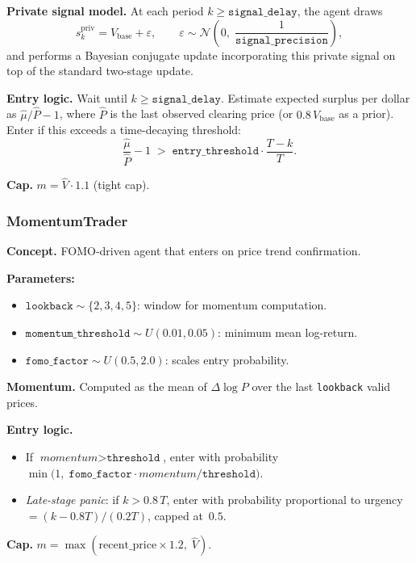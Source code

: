 \documentclass[11pt,a4paper]{article}
\begin{document}
\textbf{Private signal model.}  At each period $k \geq \texttt{signal\_delay}$, the agent draws
\[
  s^{\text{priv}}_k = V_{\text{base}} + \varepsilon, \qquad \varepsilon \sim \mathcal{N}\!\left(0,\;\frac{1}{\texttt{signal\_precision}}\right),
\]
and performs a Bayesian conjugate update incorporating this private signal on top of the standard two-stage update.

\textbf{Entry logic.}  Wait until $k \geq \texttt{signal\_delay}$.  Estimate expected surplus per dollar as $\hat{\mu}/\hat{P} - 1$, where $\hat{P}$ is the last observed clearing price (or $0.8\,V_{\text{base}}$ as a prior).  Enter if this exceeds a time-decaying threshold:
\[
  \frac{\hat{\mu}}{\hat{P}} - 1 \;>\; \texttt{entry\_threshold} \cdot \frac{T - k}{T}.
\]

\textbf{Cap.}  $m = \hat{V} \cdot 1.1$ (tight cap).


\subsubsection{MomentumTrader}
\label{sec:momentum-trader}

\textbf{Concept.}  FOMO-driven agent that enters on price trend confirmation.

\textbf{Parameters:}
\begin{itemize}[nosep]
  \item $\texttt{lookback} \sim \{2,3,4,5\}$: window for momentum computation.
  \item $\texttt{momentum\_threshold} \sim U(0.01,0.05)$: minimum mean log-return.
  \item $\texttt{fomo\_factor} \sim U(0.5,2.0)$: scales entry probability.
\end{itemize}

\textbf{Momentum.}  Computed as the mean of $\Delta\log P$ over the last \texttt{lookback} valid prices.

\textbf{Entry logic.}
\begin{itemize}[nosep]
  \item If $\textit{momentum} > \texttt{threshold}$, enter with probability $\min\!\bigl(1,\;\texttt{fomo\_factor}\cdot\textit{momentum}/\texttt{threshold}\bigr)$.
  \item \emph{Late-stage panic}: if $k > 0.8\,T$, enter with probability proportional to urgency $= (k - 0.8T)/(0.2T)$, capped at~$0.5$.
\end{itemize}

\textbf{Cap.}  $m = \max(\text{recent\_price}\times 1.2,\;\hat{V})$.
\end{document}
